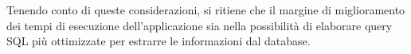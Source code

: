 \documentclass[a4paper, 12pt]{article}
\begin{document}
Tenendo conto di queste considerazioni, si ritiene che il margine di miglioramento dei tempi di esecuzione dell'applicazione sia nella possibilità di elaborare query SQL più ottimizzate per estrarre le informazioni dal database.

\newpage


\vspace*{\fill}
\begin{center}
\doclicenseImage\\
\doclicenseLongText 
\end{center}
\end{document}
